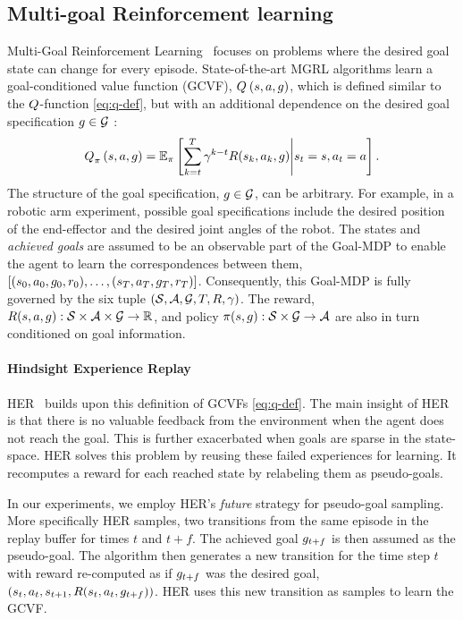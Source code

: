 \subsection{Multi-goal Reinforcement learning}
Multi-Goal Reinforcement Learning~\citep{plappert2018multi} focuses on problems
where the desired goal state can change for every episode.
State-of-the-art MGRL algorithms learn a goal-conditioned value
function (GCVF), $Q_{}^{}\left({s}, {a}, {g}\right)$, which is defined
similar to the $Q$-function \eqref{eq:q-def}, but with an additional
dependence on the desired goal specification $g \in \mathcal{G}$ :
%
\begin{align}
Q_{\pi}^{}\left({s}, {a}, {g}\right) = \mathbb{E}_\pi\left[ \sum_{k=t}^T
  \gamma^{k-t} R(s_k, a_k, g)
  \middle| s_t = s, a_t = a \right] .
  \label{eq:q-def}
\end{align}%
%
The structure of the goal specification, $g \in \mathcal{G}$, can be
arbitrary. For example, in a robotic
arm experiment, possible goal specifications include the desired position of the
end-effector and the desired joint angles of the robot.
The states and \emph{achieved goals} are assumed to be an observable part of the
Goal-MDP to enable the agent to learn the correspondences between them,
$[(s_0, a_0,
g_0, r_0), \dots, (s_T, a_T, g_T, r_T)]$.
Consequently, this Goal-MDP is fully governed by the six tuple $(\mathcal{S},
\mathcal{A},\mathcal{G}, T, R, \gamma)$. The reward, $R(s,a,
g) : \mathcal{S} \times \mathcal{A}\times \mathcal{G} \rightarrow \mathbb{R} $, and policy
$\pi(s, g): \mathcal{S} \times \mathcal{G} \rightarrow \mathcal{A} $ are
also in turn conditioned on goal information.


\paragraph{Hindsight Experience Replay}
HER~\citep{andrychowicz2017hindsight}
builds upon this definition of GCVFs \eqref{eq:q-def}.  The main insight of HER is that there is
no valuable feedback from the environment when the agent does not reach
the goal. This is further exacerbated when goals are
sparse in the state-space. 
HER solves this problem by reusing these failed experiences for learning.
It recomputes a reward for each reached state by relabeling them as pseudo-goals.

In our experiments, we employ HER's \emph{future} strategy for
pseudo-goal sampling. More specifically HER samples, two transitions
from the same episode in the replay buffer for times $t$ and $t+f$.
The achieved goal $g_{t+f}$ is then assumed as the pseudo-goal.
The algorithm then generates a new transition for the time step $t$
with reward re-computed as if $g_{t+f}$ was the desired goal,
$(s_{t}, a_t, s_{t+1}, R(s_t, a_t, g_{t+f}))$.
HER uses this new transition as samples to learn the GCVF.



